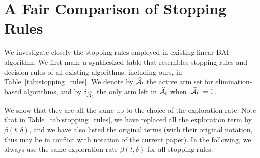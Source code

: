 \section{A Fair Comparison of Stopping Rules}\label{app:lgc.stopping}

We investigate closely the stopping rules employed in existing linear BAI algorithm. We first make a synthesized table that resembles stopping rules and decision rules of all existing algorithms, including ours, in Table~\ref{tab:stopping_rules}. We denote by $\widehat{\mathcal{A}}_t$ the active arm set for elimination-based algorithms, and by $i_{\widehat{\mathcal{A}}_t}$ the only arm left in $\widehat{\mathcal{A}}_t$ when $|\widehat{\mathcal{A}}_t|=1$.

We show that they are all the same up to the choice of the exploration rate. Note that in Table~\ref{tab:stopping_rules}, we have replaced all the exploration term by $\beta(t,\delta)$, and we have also listed the original terms (with their original notation, thus may be in conflict with notation of the current paper). In the following, we always use the same exploration rate $\beta(t,\delta)$ for all stopping rules.

